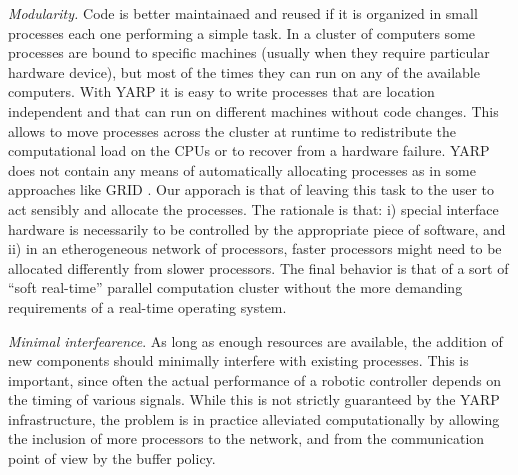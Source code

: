 \emph {Modularity.}
Code is better maintainaed and reused if it is organized in small processes 
each one performing a simple task. In a cluster of computers some processes 
are bound to specific machines (usually when they require particular hardware 
device), but most of the times they can run on any of the available computers. 
With YARP it is easy to write processes that are location independent and 
that can run on different machines without code changes. This allows to move 
processes across the cluster at runtime to redistribute the computational 
load on the CPUs or to recover from a hardware failure. 
YARP does not contain any means of automatically allocating processes as in 
some approaches like GRID \cite{grid}. Our apporach is that of leaving this
task to the user to act sensibly and allocate the processes. The rationale is that: i)
special interface hardware is necessarily to be controlled by the appropriate piece of 
software, and ii) in an etherogeneous network of processors, faster processors might 
need to be allocated differently from slower processors. The final behavior is that of 
a sort of ``soft real-time'' parallel computation cluster without the more demanding
requirements of a real-time operating system.

\emph {Minimal interfearence}. 
As long as enough resources are available, the addition of new components 
should minimally interfere with existing processes. This is important, since often 
the actual performance of a robotic controller depends on the timing of various signals. 
While this is not strictly guaranteed by the YARP infrastructure, the problem is in 
practice alleviated computationally by allowing the inclusion of more processors to 
the network, and from the communication point of view by the buffer policy.

